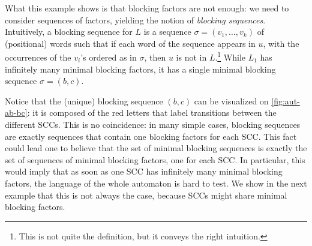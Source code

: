 \documentclass[letterpaper, USenglish, cleveref, autoref, thm-restate, numberwithinsect]{lipics-v2021}
\theoremstyle{theorem}
\theoremstyle{definition}
\begin{document}
\begin{example}
	What this example shows is that blocking factors are not enough: we need to consider sequences of factors, yielding the notion of \emph{blocking sequences}.
	Intuitively, a blocking sequence for $L$ is a sequence $\sigma = (v_1,\ldots, v_k)$ of (positional) words such that if each word of the sequence appears in $u$, with the occurrences of the $v_i$'s ordered as in $\sigma$, then $u$ is not in $L$.\footnote{This is not quite the definition, but it conveys the right intuition.}
	While $L_1$ has infinitely many minimal blocking factors, it has a single minimal blocking sequence $\sigma = (b, c)$.
\end{example}

Notice that the (unique) blocking sequence $(b,c)$ can be visualized on \cref{fig:aut-ab-bc}:
it is composed of the red letters that label transitions between the different SCCs. This is no coincidence: in many simple cases, blocking sequences are exactly sequences that contain one blocking factors for each SCC.
This fact could lead one to believe that the set of minimal blocking sequences is exactly the set of sequences of minimal blocking factors, one for each SCC. In particular, this would imply that as soon as one SCC has infinitely many minimal blocking factors, the language of the whole automaton is hard to test.
We show in the next example that this is not always the case, because SCCs might share minimal blocking factors.
\end{document}
